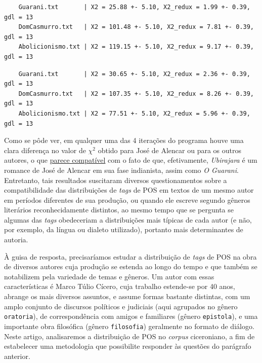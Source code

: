 \documentclass[10pt,a4paper,onecolumn]{article}
\theoremstyle{definition}
\theoremstyle{remark}
\begin{document}
\begin{verbatim}
	Guarani.txt       | X2 = 25.88 +- 5.10, X2_redux = 1.99 +- 0.39, gdl = 13
	DomCasmurro.txt   | X2 = 101.48 +- 5.10, X2_redux = 7.81 +- 0.39, gdl = 13
	Abolicionismo.txt | X2 = 119.15 +- 5.10, X2_redux = 9.17 +- 0.39, gdl = 13
\end{verbatim}

\begin{verbatim}
	Guarani.txt       | X2 = 30.65 +- 5.10, X2_redux = 2.36 +- 0.39, gdl = 13
	DomCasmurro.txt   | X2 = 107.35 +- 5.10, X2_redux = 8.26 +- 0.39, gdl = 13
	Abolicionismo.txt | X2 = 77.51 +- 5.10, X2_redux = 5.96 +- 0.39, gdl = 13
\end{verbatim}

Como se pôde ver, em qualquer uma das 4 iterações do programa houve uma clara diferença no valor de $\chi^2$ obtido para José de Alencar ou para os outros autores, o que \underline{parece compatível} com o fato de que, efetivamente, \emph{Ubirajara} é um romance de José de Alencar em sua fase indianista, assim como \emph{O Guarani}. Entretanto, tais resultados suscitaram diversos questionamentos sobre a compatibilidade das distribuições de \emph{tags} de POS em textos de um mesmo autor em períodos diferentes de sua produção, ou quando ele escreve segundo gêneros literários reconhecidamente distintos, ao mesmo tempo que se pergunta se algumas das \emph{tags} obedeceriam a distribuições mais típicas de cada autor (e não, por exemplo, da língua ou dialeto utilizado), portanto mais determinantes de autoria.

\break

À guisa de resposta, precisaríamos estudar a distribuição de \emph{tags} de POS na obra de diversos autores cuja produção se estenda ao longo do tempo e que também se notabilizem pela variedade de temas e gêneros. Um autor com essas características é Marco Túlio Cícero, cuja trabalho estende-se por 40 anos, abrange os mais diversos assuntos, e assume formas bastante distintas, com um amplo conjunto de discursos políticos e judiciais (aqui agrupados no gênero \texttt{oratoria}), de correspondência com amigos e familiares (gênero \texttt{epistola}), e uma importante obra filosófica (gênero \texttt{filosofia}) geralmente no formato de diálogo. Neste artigo, analisaremos a distribuição de POS no \emph{corpus} ciceroniano, a fim de estabelecer uma metodologia que possibilite responder às questões do parágrafo anterior.    
\end{document}
